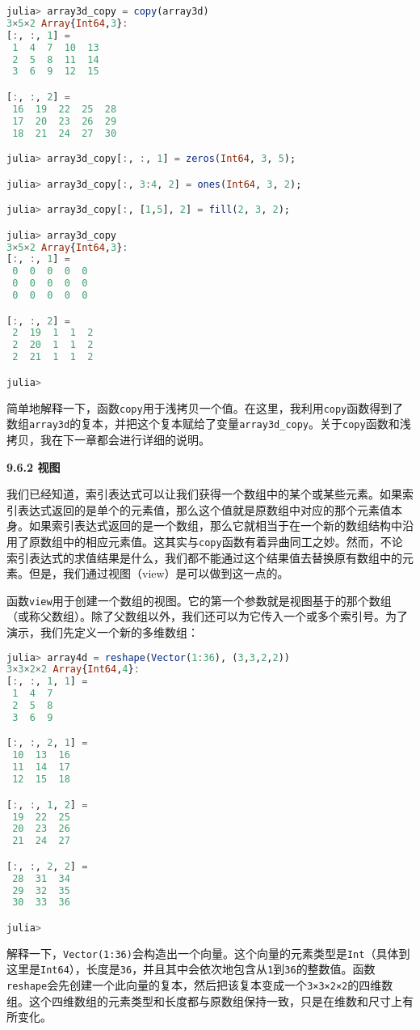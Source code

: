 \begin{lstlisting}[language=julia]
julia> array3d_copy = copy(array3d)
3×5×2 Array{Int64,3}:
[:, :, 1] =
 1  4  7  10  13
 2  5  8  11  14
 3  6  9  12  15

[:, :, 2] =
 16  19  22  25  28
 17  20  23  26  29
 18  21  24  27  30

julia> array3d_copy[:, :, 1] = zeros(Int64, 3, 5);

julia> array3d_copy[:, 3:4, 2] = ones(Int64, 3, 2);

julia> array3d_copy[:, [1,5], 2] = fill(2, 3, 2);

julia> array3d_copy
3×5×2 Array{Int64,3}:
[:, :, 1] =
 0  0  0  0  0
 0  0  0  0  0
 0  0  0  0  0

[:, :, 2] =
 2  19  1  1  2
 2  20  1  1  2
 2  21  1  1  2

julia> 
\end{lstlisting}

简单地解释一下，函数\verb`copy`用于浅拷贝一个值。在这里，我利用\verb`copy`函数得到了数组\verb`array3d`的复本，并把这个复本赋给了变量\verb`array3d_copy`。关于\verb`copy`函数和浅拷贝，我在下一章都会进行详细的说明。

\textbf{9.6.2 视图}

我们已经知道，索引表达式可以让我们获得一个数组中的某个或某些元素。如果索引表达式返回的是单个的元素值，那么这个值就是原数组中对应的那个元素值本身。如果索引表达式返回的是一个数组，那么它就相当于在一个新的数组结构中沿用了原数组中的相应元素值。这其实与\verb`copy`函数有着异曲同工之妙。然而，不论索引表达式的求值结果是什么，我们都不能通过这个结果值去替换原有数组中的元素。但是，我们通过视图（view）是可以做到这一点的。

函数\verb`view`用于创建一个数组的视图。它的第一个参数就是视图基于的那个数组（或称父数组）。除了父数组以外，我们还可以为它传入一个或多个索引号。为了演示，我们先定义一个新的多维数组：

\begin{lstlisting}[language=julia]
julia> array4d = reshape(Vector(1:36), (3,3,2,2))
3×3×2×2 Array{Int64,4}:
[:, :, 1, 1] =
 1  4  7
 2  5  8
 3  6  9

[:, :, 2, 1] =
 10  13  16
 11  14  17
 12  15  18

[:, :, 1, 2] =
 19  22  25
 20  23  26
 21  24  27

[:, :, 2, 2] =
 28  31  34
 29  32  35
 30  33  36

julia> 
\end{lstlisting}

解释一下，\verb`Vector(1:36)`会构造出一个向量。这个向量的元素类型是\verb`Int`（具体到这里是\verb`Int64`），长度是\verb`36`，并且其中会依次地包含从\verb`1`到\verb`36`的整数值。函数\verb`reshape`会先创建一个此向量的复本，然后把该复本变成一个\verb`3×3×2×2`的四维数组。这个四维数组的元素类型和长度都与原数组保持一致，只是在维数和尺寸上有所变化。

